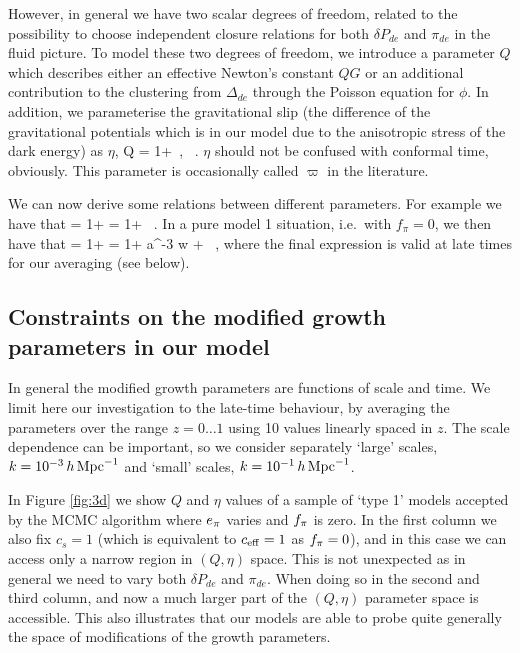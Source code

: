 However, in general we have two scalar degrees of freedom, related to the possibility to choose independent closure relations for
both $\delta P_{de}$ and $\pi_{de}$ in the fluid picture. To model these two degrees of freedom, 
we introduce a parameter $Q$ which describes either an effective Newton's constant $Q G$ or an additional contribution
to the clustering from $\Delta_{de}$ through the Poisson equation for $\phi$.
In addition, we parameterise the gravitational slip (the difference of the gravitational potentials which is in our model due to the
anisotropic stress of the dark energy) as $\eta$,
\be
Q \equiv {}
= 1+ 
\,, \qquad
\eta \equiv \frac{\phi}{\psi} \, .
\ee
$\eta$ should not be confused with conformal time, obviously. This parameter is occasionally called $\varpi$ in the literature.

We can now derive some relations between different parameters. For example we have that
\be
{} = 1+   = 1+  \, .
\ee
In a pure model 1 situation, i.e.\ with $f_\pi=0$, we then have that
\be
{} = 1+   = 1+   a^{-3 w} +  \, ,
\label{eq:q_eta}
\ee
where the final expression is valid at late times for our averaging (see below). 

\subsection{Constraints on the modified growth parameters in our model}

In general the modified growth parameters are functions of scale and time. We limit here our investigation to the late-time behaviour,
by averaging the parameters over the range $z=0\ldots 1$ using 10 values linearly spaced in $z$. The scale dependence can be
important, so we consider separately `large' scales, $k = 10^{-3} \,h\, \Mpc^{-1}$ and `small' scales, $k = 10^{-1} \,h\, \Mpc^{-1}$. 

In Figure \ref{fig:3d} we show $Q$ and $\eta$ values of a sample of `type 1' models accepted by the MCMC algorithm where $\aa$ varies and $\ff$ is zero. In the first column
we also fix $c_s=1$ (which is equivalent to $\ceff=1$ as $\ff=0$), and in this case we can access only a narrow region in $(Q,\eta)$
space. This is not unexpected as in general we need to vary both $\delta P_{de}$ and $\pi_{de}$. When doing so in the second and third column,
and now a much larger part of the $(Q,\eta)$ parameter space is accessible.  This also illustrates that our models are able to probe
quite generally the space of modifications of the growth parameters.

